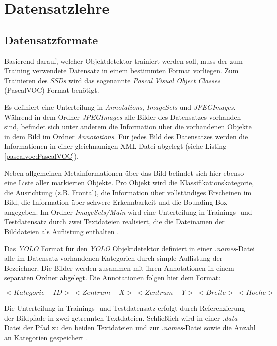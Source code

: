 \section{Datensatzlehre}

\subsection*{Datensatzformate}

Basierend darauf, welcher Objektdetektor trainiert werden soll, muss der zum Training verwendete Datensatz in einem bestimmten Format vorliegen. Zum Trainieren des \textit{SSDs} wird das sogenannte \textit{Pascal Visual Object Classes} (PascalVOC) Format benötigt. 

Es definiert eine Unterteilung in \textit{Annotations}, \textit{ImageSets} und \textit{JPEGImages}. Während in dem Ordner \textit{JPEGImages} alle Bilder des Datensatzes vorhanden sind, befindet sich unter anderem die Information über die vorhandenen Objekte in dem Bild im Ordner \textit{Annotations}. Für jedes Bild des Datensatzes werden die Informationen in einer gleichnamigen XML-Datei abgelegt (siehe Listing \ref{pascalvoc:PascalVOC}).

\lstset{language=XML}


Neben allgemeinen Metainformationen über das Bild befindet sich hier ebenso eine Liste aller markierten Objekte. Pro Objekt wird die Klassifikationskategorie, die Ausrichtung (z.B. \glqq Frontal\grqq{}), die Information über vollständiges Erscheinen im Bild, die Information über schwere Erkennbarkeit und die Bounding Box angegeben. Im Ordner \textit{ImageSets/Main} wird eine Unterteilung in Trainings- und Testdatensatz durch zwei Textdateien realisiert, die die Dateinamen der Bilddateien als Auflistung enthalten \cite{RenuKhandelwal.2019}. 

Das \textit{YOLO} Format für den \textit{YOLO} Objektdetektor definiert in einer \textit{.names}-Datei alle im Datensatz vorhandenen Kategorien durch simple Auflistung der Bezeichner. Die Bilder werden zusammen mit ihren Annotationen in einem separaten Ordner abgelegt. Die Annotationen folgen hier dem Format:

$<Kategorie-ID>\:<Zentrum-X>\:<Zentrum-Y>\:<Breite>\:<Hoehe>$

Die Unterteilung in Trainings- und Testdatensatz erfolgt durch Referenzierung der Bildpfade in zwei getrennten Textdateien. Schließlich wird in einer \textit{.data}-Datei der Pfad zu den beiden Textdateien und zur \textit{.names}-Datei sowie die Anzahl an Kategorien gespeichert \cite{ArunPonnusamy.20191006}. 

